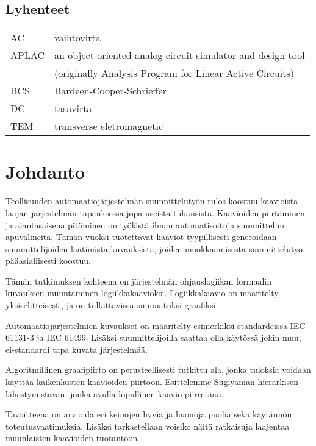 \documentclass[finnish,12pt]{article}
\begin{document}
	\subsection*{Lyhenteet}

	\begin{tabular}{ll}
AC         & vaihtovirta \\
APLAC      & an object-oriented analog circuit simulator and design tool \\
           & (originally Analysis Program for Linear Active Circuits) \\
BCS        & Bardeen-Cooper-Schrieffer \\ %
DC         & tasavirta \\
TEM        & transverse eletromagnetic
	\end{tabular}


	\cleardoublepage
	\storeinipagenumber
	\setcounter{page}{1}

	\section{Johdanto}
	\thispagestyle{empty}

Teollisuuden automaatiojärjestelmän suunnittelutyön tulos koostuu kaavioista - laajan järjestelmän tapauksessa jopa useista tuhansista. 
Kaavioiden piirtäminen ja ajantasaisena pitäminen on työlästä ilman automatisoituja suunnittelun apuvälineitä.
Tämän vuoksi tuotettavat kaaviot tyypillisesti generoidaan suunnittelijoiden laatimista kuvauksista, joiden muokkaamisesta suunnittelutyö pääasiallisesti koostuu.

Tämän tutkimuksen kohteena on järjestelmän ohjauslogiikan formaalin kuvauksen muuntaminen logiikkakaavioksi.
Logiikkakaavio on määritelty yksiselitteisesti, ja on tulkittavissa suunnatuksi graafiksi.

Automaatiojärjestelmien kuvaukset on määritelty esimerkiksi standardeissa IEC 61131-3 ja IEC 61499.
Lisäksi suunnittelijoilla saattaa olla käytössä jokin muu, ei-standardi tapa kuvata järjestelmää.


Algoritmillinen graafipiirto on perusteellisesti tutkittu ala, jonka tuloksia voidaan käyttää kaikenlaisten kaavioiden piirtoon.
Esittelemme Sugiyaman hierarkisen lähestymistavan. jonka avulla lopullinen kaavio piirretään.

Tavoitteena on arvioida eri keinojen hyviä ja huonoja puolia sekä käytännön toteutusvaatimuksia.
Lisäksi tarkastellaan voisiko näitä ratkaisuja laajentaa muunlaisten kaavioiden tuotantoon.
\end{document}
